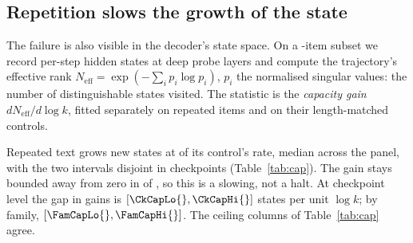 \documentclass{article}
\begin{document}
\subsection{Repetition slows the growth of the state}
\label{sec:cap}

The failure is also visible in the decoder's state space. On a
\NInstrumented{}-item subset we record per-step hidden
states at deep probe layers and compute the trajectory's effective rank
$N_{\mathrm{eff}} = \exp(-\sum_i p_i \log p_i)$, $p_i$ the normalised
singular values: the number of distinguishable states visited.
The statistic is the \emph{capacity gain} $dN_{\mathrm{eff}}/d\log k$,
fitted separately on repeated items and on their length-matched
controls.

Repeated text grows new states at \CapRatio{} of its control's rate, median
across the panel, with the two intervals disjoint in \CapSepPhrase{}
checkpoints (Table~\ref{tab:cap}). The gain stays bounded away from zero in \CapPosModels{} of
\NCapModels{}, so this is a slowing, not a halt. At
checkpoint level the gap in gains is \CkCap{} $[\CkCapLo{},\CkCapHi{}]$
states per unit $\log k$; by family, \FamCap{} $[\FamCapLo{},\FamCapHi{}]$. The ceiling columns of Table~\ref{tab:cap} agree.
\end{document}
